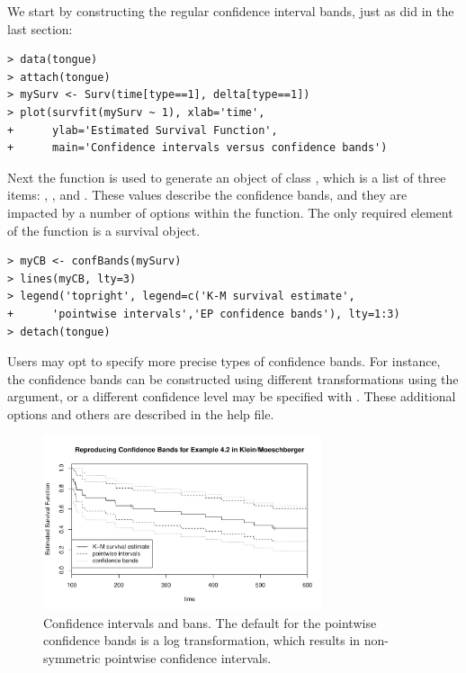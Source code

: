 \documentclass[article]{jss}
\begin{document}
We start by constructing the regular confidence interval bands, just as did in the last section:
\begin{verbatim}
> data(tongue)
> attach(tongue)
> mySurv <- Surv(time[type==1], delta[type==1])
> plot(survfit(mySurv ~ 1), xlab='time',
+      ylab='Estimated Survival Function',
+      main='Confidence intervals versus confidence bands')
\end{verbatim}
Next the  function is used to generate an object of class , which is a list of three items: , , and . These values describe the confidence bands, and they are impacted by a number of options within the  function. The only required element of the function is a survival object.
\begin{verbatim}
> myCB <- confBands(mySurv)
> lines(myCB, lty=3)
> legend('topright', legend=c('K-M survival estimate',
+      'pointwise intervals','EP confidence bands'), lty=1:3)
> detach(tongue)
\end{verbatim}
Users may opt to specify more precise types of confidence bands. For instance, the confidence bands can be constructed using different transformations using the  argument, or a different confidence level may be specified with . These additional options and others are described in the  help file.
\begin{figure}[hb]
\centering
\includegraphics[width=0.73\textwidth]{../../figures/confBand.pdf} \vspace{-4mm}
\caption{Confidence intervals and bans. The default for the pointwise confidence bands is a log transformation, which results in non-symmetric pointwise confidence intervals.} %
\label{confBand}
\end{figure}

\pagebreak
\end{document}
